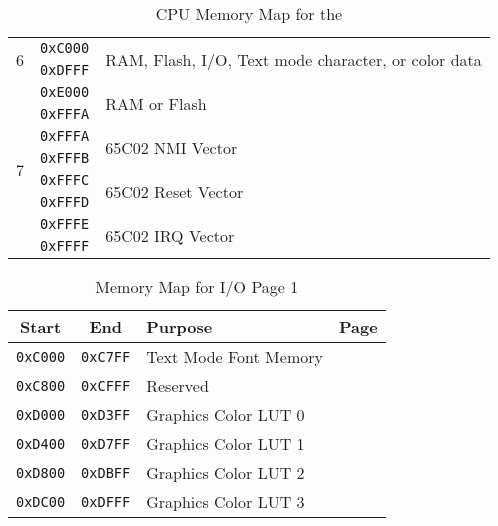 \begin{table}[ht]
\begin{center}
\begin{tabular}{|c|c|l|}
            \multirow{2}{*}{6} & \verb+0xC000+ & \multirow{2}{*}{RAM, Flash, I/O, Text mode character, or color data} \\ \cline{2-2}
            & \verb+0xDFFF+ & \\ \hline
            \multirow{8}{*}{7} & \verb+0xE000+ & \multirow{2}{*}{RAM or Flash} \\ \cline{2-2}
            & \verb+0xFFFA+ & \\ \cline{2-3}
            & \verb+0xFFFA+ & \multirow{2}{*}{65C02 NMI Vector} \\ \cline{2-2}
            &\verb+0xFFFB+ & \\ \cline{2-3}
            &\verb+0xFFFC+ & \multirow{2}{*}{65C02 Reset Vector} \\ \cline{2-2}
            &\verb+0xFFFD+ & \\ \cline{2-3}
            &\verb+0xFFFE+ & \multirow{2}{*}{65C02 IRQ Vector} \\ \cline{2-2}
            &\verb+0xFFFF+ & \\ \hline
        \end{tabular}
    \end{center}
    \caption{CPU Memory Map for the \jr}
    \label{tab:cpu_mem_map}
\end{table}



\begin{table}[ht]
    \begin{center}
        \begin{tabular}{|c|c|l|l|} \hline
            Start & End & Purpose & Page \\ \hline\hline
            \verb+0xC000+ & \verb+0xC7FF+ & Text Mode Font Memory & \pageref{sec:text_font} \\ \hline
            \verb+0xC800+ & \verb+0xCFFF+ & Reserved & \\ \hline
            \verb+0xD000+ & \verb+0xD3FF+ & Graphics Color LUT 0 & \multirow{4}{*}{\pageref{tab:graph_cluts}} \\ \cline{1-3}
            \verb+0xD400+ & \verb+0xD7FF+ & Graphics Color LUT 1 & \\ \cline{1-3}
            \verb+0xD800+ & \verb+0xDBFF+ & Graphics Color LUT 2 & \\ \cline{1-3}
            \verb+0xDC00+ & \verb+0xDFFF+ & Graphics Color LUT 3 & \\ \hline
        \end{tabular}
    \end{center}
    \caption{Memory Map for I/O Page 1}
    \label{tab:map_io_1}
\end{table}
